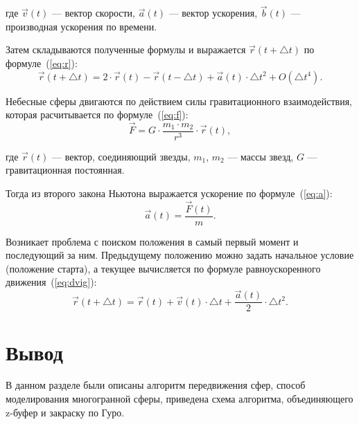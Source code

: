 \noindent где $\overrightarrow{v}(t)$ --- вектор скорости, $\overrightarrow{a}(t)$ --- вектор ускорения, $\overrightarrow{b}(t)$ --- производная ускорения по времени.

Затем складываются полученные формулы и выражается $\overrightarrow{r}(t + \bigtriangleup{t})$ по формуле~(\ref{eq:r}):
    \begin{equation}\label{eq:r}
	    \overrightarrow{r}(t + \bigtriangleup{t}) = 2 \cdot \overrightarrow{r}(t) - \overrightarrow{r}(t - \bigtriangleup{t}) + \overrightarrow{a}(t) \cdot \bigtriangleup{t}^2 + O(\bigtriangleup{t}^4).
    \end{equation}

Небесные сферы двигаются по действием силы гравитационного взаимодействия, которая расчитывается по формуле~(\ref{eq:f}):
    \begin{equation}\label{eq:f}
	    \overrightarrow{F} =  G \cdot \frac{m_{1} \cdot m_{2}}{r^3} \cdot \overrightarrow{r}(t),
    \end{equation}

\noindent где $\overrightarrow{r}(t)$ --- вектор, соединяющий звезды, $m_{1}$, $m_{2}$ --- массы звезд, $G$ --- гравитационная постоянная.

Тогда из второго закона Ньютона выражается ускорение по формуле~(\ref{eq:a}):
    \begin{equation}\label{eq:a}
	    \overrightarrow{a}(t) = \frac{\overrightarrow{F}(t)}{m}.
    \end{equation}

Возникает проблема с поиском положения в самый первый момент и последующий за ним. Предыдущему положению можно задать начальное условие (положение старта), а текущее вычисляется по формуле равноускоренного движения~(\ref{eq:dvig}):
    \begin{equation}\label{eq:dvig}
	    \overrightarrow{r}(t + \bigtriangleup{t}) = \overrightarrow{r}(t) + \overrightarrow{v}(t) \cdot \bigtriangleup{t} + \frac{\overrightarrow{a}(t)}{2} \cdot \bigtriangleup{t}^2.
    \end{equation}


\section{Вывод}

В данном разделе были описаны алгоритм передвижения сфер, способ моделирования многогранной сферы, приведена схема алгоритма, объединяющего z-буфер и закраску по Гуро.

